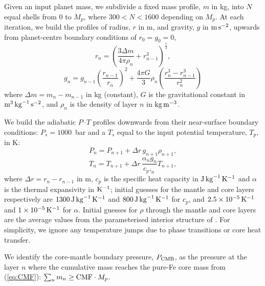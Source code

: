 Given an input planet mass, we subdivide a fixed mass profile, $m$ in kg, into $N$ equal shells from 0 to $M_p$, where $300 < N < 1600$ depending on $M_p$. At each iteration, we build the profiles of radius, $r$ in m, and gravity, $g$ in ${\rm m}\,{\rm s}^{-2}$, upwards from planet-centre boundary conditions of $r_0 = g_0 = 0$, 
\begin{equation}\label{eq:radius_prof}
r_n = \left(\frac{3\Delta m }{4 \pi \rho_n} + r_{n - 1}^3\right)^{\frac{1}{3}},
\end{equation}
\begin{equation}\label{eq:gravity_prof}
g_n = g_{n - 1} \left(\frac{r_{n - 1}}{r_n}\right)^2 + \frac{4 \pi G}{3} \rho_n \left(\frac{r_n^3 - r_{n - 1}^3}{r_n^2}\right)
\end{equation}
where $\Delta m = m_n - m_{n - 1}$ in kg (constant), $G$ is the gravitational constant in ${\rm m}^3 \, {\rm kg}^{-1}\,{\rm s}^{-2}$, and $\rho_n$ is the density of layer $n$ in ${\rm kg} \, {\rm m}^{-3}$.

We build the adiabatic $P$--$T$ profiles downwards from their near-surface boundary conditions: $P_s = 1000$~bar and a $T_s$ equal to the input potential temperature, $T_p$, in K:
\begin{equation}\label{eq:pressure_prof}
P_{n} = P_{n + 1} + \Delta r \, g_{n + 1} \rho_{n + 1},
\end{equation}
\begin{equation}\label{eq:temperature_prof}
T_{n} = T_{n + 1} + \Delta r \, \frac{\alpha_{n}g_{n}}{c_p,_{n}} T_{n + 1},
\end{equation}
where $\Delta r = r_n - r_{n - 1}$ in m, $c_p$ is the specific heat capacity in ${\rm J}\,{\rm kg}^{-1}\, {\rm K}^{-1}$ and $\alpha$ is the thermal expansivity in ${\rm K}^{-1}$; initial guesses for the mantle and core layers respectively are $1300\,{\rm J}\,{\rm kg}^{-1}\, {\rm K}^{-1}$ and $800\,{\rm J}\,{\rm kg}^{-1}\, {\rm K}^{-1}$ for $c_p$, and $2.5 \times 10^{-5}\,{\rm K}^{-1}$ and $1 \times 10^{-5}\,{\rm K}^{-1}$ for $\alpha$. Initial guesses for $\rho$ through the mantle and core layers are the average values from the parameterised interior structure of \citet{noack_parameterisations_2020}. For simplicity, we ignore any temperature jumps due to phase transitions or core heat transfer. 

We identify the core-mantle boundary pressure, $P_{\rm CMB}$, as the pressure at the layer $n$ where the cumulative mass reaches the pure-Fe core mass from (\ref{eq:CMF}): $\sum_n m_n \ge {\rm CMF} \cdot M_p$.


